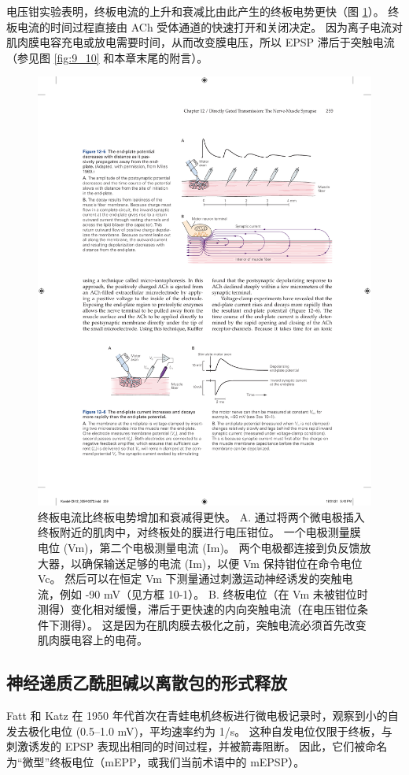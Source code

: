 电压钳实验表明，终板电流的上升和衰减比由此产生的终板电势更快（图 \ref{fig:12_6}）。 
终板电流的时间过程直接由 ACh 受体通道的快速打开和关闭决定。
因为离子电流对肌肉膜电容充电或放电需要时间，从而改变膜电压，所以 EPSP 滞后于突触电流（参见图 \ref{fig:9_10} 和本章末尾的附言）。

\begin{figure}[htbp]
	\centering
	\includegraphics[width=0.7\linewidth]{chap12/fig_12_6}
	\caption{终板电流比终板电势增加和衰减得更快。 A. 通过将两个微电极插入终板附近的肌肉中，对终板处的膜进行电压钳位。 一个电极测量膜电位 (Vm)，第二个电极测量电流 (Im)。 两个电极都连接到负反馈放大器，以确保输送足够的电流 (Im)，以便 Vm 保持钳位在命令电位 Vc。 然后可以在恒定 Vm 下测量通过刺激运动神经诱发的突触电流，例如 -90 mV（见方框 10-1）。 B. 终板电位（在 Vm 未被钳位时测得）变化相对缓慢，滞后于更快速的内向突触电流（在电压钳位条件下测得）。 这是因为在肌肉膜去极化之前，突触电流必须首先改变肌肉膜电容上的电荷。}
	\label{fig:12_6}
\end{figure}



\subsection{神经递质乙酰胆碱以离散包的形式释放}

Fatt 和 Katz 在 1950 年代首次在青蛙电机终板进行微电极记录时，观察到小的自发去极化电位 (0.5–1.0 mV)，平均速率约为 1/s。 
这种自发电位仅限于终板，与刺激诱发的 EPSP 表现出相同的时间过程，并被箭毒阻断。 
因此，它们被命名为“微型”终板电位（mEPP，或我们当前术语中的 mEPSP）。


